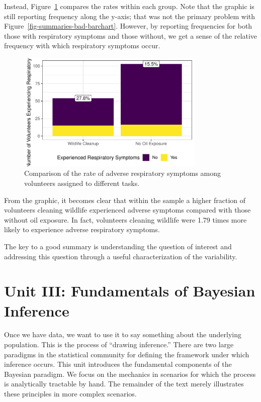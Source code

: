 \documentclass[
  letterpaper,
  DIV=11,
  numbers=noendperiod]{scrreprt}
\theoremstyle{definition}
\theoremstyle{plain}
\theoremstyle{definition}
\theoremstyle{remark}
\begin{document}
Instead, Figure~\ref{fig-summaries-good-barchart} compares the rates
within each group. Note that the graphic is still reporting frequency
along the y-axis; that was not the primary problem with
Figure~\ref{fig-summaries-bad-barchart}. However, by reporting
frequencies for both those with respiratory symptoms and those without,
we get a sense of the relative frequency with which respiratory symptoms
occur.

\begin{figure}

{\centering \includegraphics[width=0.8\textwidth,height=\textheight]{./images/fig-summaries-good-barchart-1.pdf}

}

\caption{\label{fig-summaries-good-barchart}Comparison of the rate of
adverse respiratory symptoms among volunteers assigned to different
tasks.}

\end{figure}

From the graphic, it becomes clear that within the sample a higher
fraction of volunteers cleaning wildlife experienced adverse symptoms
compared with those without oil exposure. In fact, volunteers cleaning
wildlife were 1.79 times more likely to experience adverse respiratory
symptoms.

The key to a good summary is understanding the question of interest and
addressing this question through a useful characterization of the
variability.

\part{Unit III: Fundamentals of Bayesian Inference}

Once we have data, we want to use it to say something about the
underlying population. This is the process of ``drawing inference.''
There are two large paradigms in the statistical community for defining
the framework under which inference occurs. This unit introduces the
fundamental components of the Bayesian paradigm. We focus on the
mechanics in scenarios for which the process is analytically tractable
by hand. The remainder of the text merely illustrates these principles
in more complex scenarios.
\end{document}
